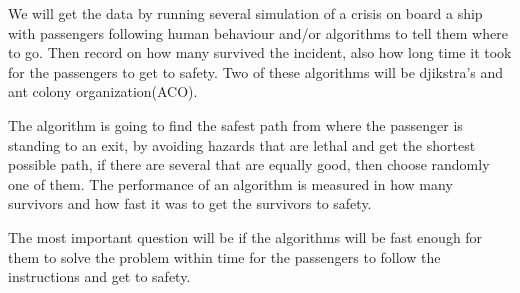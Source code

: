 We will get the data by running several simulation of a crisis on board a ship with passengers following human behaviour and/or algorithms to tell them where to go. Then record on how many survived the incident, also how long time it took for the passengers to get to safety. Two of these algorithms will be djikstra's and ant colony organization(ACO).

The algorithm is going to find the safest path from where the passenger is standing to an exit, by avoiding hazards that are lethal and get the shortest possible path, if there are several that are equally good, then choose randomly one of them. The performance of an algorithm is measured in how many survivors and how fast it was to get the survivors to safety.

The most important question will be if the algorithms will be fast enough for them to solve the problem within time for the passengers to follow the instructions and get to safety.


 

